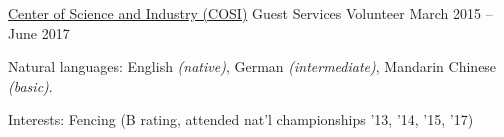\documentclass[10pt,a4paper]{article}
\begin{document}
\headedsection
  {\href{https://cosi.org/}{Center of Science and Industry (COSI)}}
  {\headedsubsection
    {Guest Services Volunteer}
    {March 2015 -- June 2017}
    {}
}

\spacedhrule{0.5em}{-0.4em}

  
\inlineheadsection
  {Natural languages:}
  {English \emph{(native)}, German \emph{(intermediate)}, Mandarin Chinese \emph{(basic)}.}

\inlineheadsection
  {Interests:}
  {Fencing (B rating, attended nat'l championships '13, '14, '15, '17)}
\end{document}
